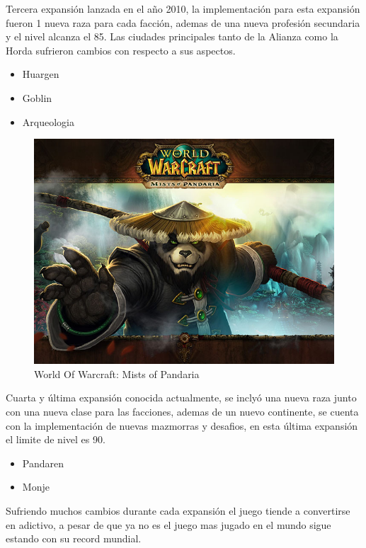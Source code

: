 Tercera expansión lanzada en el año 2010, la implementación para esta expansión fueron 1 nueva raza para cada facción, ademas de una nueva profesión secundaria y el nivel alcanza el 85. Las ciudades principales tanto de la Alianza como la Horda sufrieron cambios con respecto a sus aspectos.

\begin{itemize}
\item Huargen
\item Goblin

\item Arqueologia
\end{itemize}

\newpage
\begin{figure}[htbp]
\begin{center}
\includegraphics[width=.60\textwidth]{./imagenes/wowpandaren.jpg}
\caption{World Of Warcraft: Mists of Pandaria}
\label{World Of Warcraft: Mists of Pandaria}
\end{center}
\end{figure}
Cuarta y última expansión conocida actualmente, se inclyó una nueva raza junto con una nueva clase para las facciones, ademas de un nuevo continente, se cuenta con la implementación de nuevas mazmorras y desafios, en esta última expansión el limite de nivel es 90.

\begin{itemize}
\item Pandaren
\item Monje
\end{itemize}

Sufriendo muchos cambios durante cada expansión el juego tiende a convertirse en adictivo, a pesar de que ya no es el juego mas jugado en el mundo sigue estando con su record mundial.

